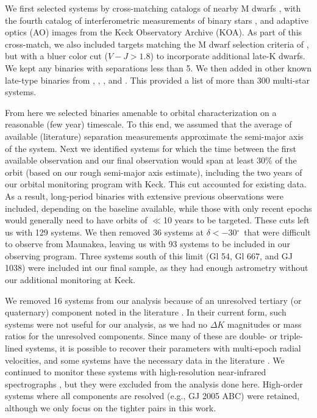 \documentclass[twocolumn]{aastex62}
\newcommand{\degree}{$^{\circ}$}
\begin{document}
We first selected systems by cross-matching catalogs of nearby M dwarfs \citep{Lepine2013, Gaidos2014, 2014ApJ...784..156D,Winters2015}, with the fourth catalog of interferometric measurements of binary stars \citep[INT4,][]{Hartkopf:2001}, and adaptive optics (AO) images from the Keck Observatory Archive (KOA). As part of this cross-match, we also included targets matching the M dwarf selection criteria of \citet{Gaidos2014}, but with a bluer color cut ($V-J>1.8$) to incorporate additional late-K dwarfs. We kept any binaries with separations less than 5\arcsec. We then added in other known late-type binaries from \citet{2008MNRAS.384..150L}, \citet{Jnn2012}, \citet{Jnn2014}, and \citet{Ward-Duong2015}. This provided a list of more than 300 multi-star systems.

From here we selected binaries amenable to orbital characterization on a reasonable (few year) timescale. To this end, we assumed that the average of available (literature) separation measurements approximate the semi-major axis of the system. Next we identified systems for which the time between the first available observation and our final observation would span at least 30\% of the orbit (based on our rough semi-major axis estimate), including the two years of our orbital monitoring program with Keck. This cut accounted for existing data. As a result, long-period binaries with extensive previous observations were included, depending on the baseline available, while those with only recent epochs would generally need to have orbits of $\ll$10 years to be targeted. These cuts left us with 129 systems. We then removed 36 systems at $\delta<-30$\degree\ that were difficult to observe from Maunakea, leaving us with 93 systems to be included in our observing program. Three systems south of this limit (Gl 54, Gl 667, and GJ 1038) were included int our final sample, as they had enough astrometry without our additional monitoring at Keck.

We removed 16 systems from our analysis because of an unresolved tertiary (or quaternary) component noted in the literature \citep[e.g.,][]{2010ApJ...720.1727L,2002A&A...382..118T,2018ApJS..235....6T}. In their current form, such systems were not useful for our analysis, as we had no $\Delta K$ magnitudes or mass ratios for the unresolved components. Since many of these are double- or triple-lined systems, it is possible to recover their parameters with multi-epoch radial velocities, and some systems have the necessary data in the literature \citep[e.g.,][]{Sgr2000}. We continued to monitor these systems with high-resolution near-infrared spectrographs \citep{2010SPIE.7735E..1MY, 2012SPIE.8446E..2CR, Park2014}, but they were excluded from the analysis done here. High-order systems where all components are resolved (e.g., GJ 2005 ABC) were retained, although we only focus on the tighter pairs in this work. 
\end{document}
